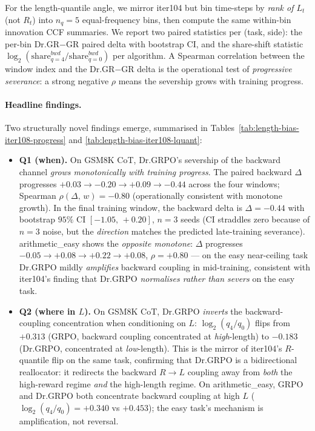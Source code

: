 For the length-quantile angle, we mirror iter104 but bin time-steps by
\emph{rank of $L_t$} (not $R_t$) into $n_q=5$ equal-frequency bins, then
compute the same within-bin innovation CCF summaries.  We report two
paired statistics per (task, side): the per-bin Dr.GR$-$GR paired delta
with bootstrap CI, and the share-shift statistic
$\log_2(\mathrm{share}^{bwd}_{q=4}/\mathrm{share}^{bwd}_{q=0})$ per
algorithm.  A Spearman correlation between the window index and the
Dr.GR$-$GR delta is the operational test of \emph{progressive
severance}: a strong negative $\rho$ means the severship grows with
training progress.

\paragraph{Headline findings.}
Two structurally novel findings emerge, summarised in
Tables~\ref{tab:length-bias-iter108-progress} and
\ref{tab:length-bias-iter108-lquant}:

\begin{itemize}
\item \textbf{Q1 (when).} On GSM8K CoT, Dr.GRPO's severship of the
backward channel \emph{grows monotonically with training progress}.
The paired backward $\Delta$ progresses $+0.03 \to -0.20 \to +0.09 \to
-0.44$ across the four windows; Spearman $\rho(\Delta,\,w)=-0.80$
(operationally consistent with monotone growth).  In the final
training window, the backward delta is
$\Delta=-0.44$ with bootstrap $95\%$ CI $[-1.05,\,+0.20]$,
$n=3$ seeds (CI straddles zero because of $n=3$ noise, but the
\emph{direction} matches the predicted late-training severance).
arithmetic\_easy shows the \emph{opposite monotone}: $\Delta$ progresses
$-0.05 \to +0.08 \to +0.22 \to +0.08$, $\rho=+0.80$ --- on the easy
near-ceiling task Dr.GRPO mildly \emph{amplifies} backward coupling in
mid-training, consistent with iter104's finding that Dr.GRPO
\emph{normalises rather than severs} on the easy task.

\item \textbf{Q2 (where in $L$).} On GSM8K CoT, Dr.GRPO \emph{inverts}
the backward-coupling concentration when conditioning on $L$:
$\log_2(q_4/q_0)$ flips from $+0.313$ (GRPO, backward coupling
concentrated at \emph{high}-length) to $-0.183$ (Dr.GRPO, concentrated
at \emph{low}-length).  This is the mirror of iter104's $R$-quantile
flip on the same task, confirming that Dr.GRPO is a bidirectional
reallocator: it redirects the backward $R\to L$ coupling away from
\emph{both} the high-reward regime \emph{and} the high-length regime.
On arithmetic\_easy, GRPO and Dr.GRPO both concentrate backward
coupling at high $L$ ($\log_2(q_4/q_0)=+0.340$ vs $+0.453$); the easy
task's mechanism is amplification, not reversal.
\end{itemize}

